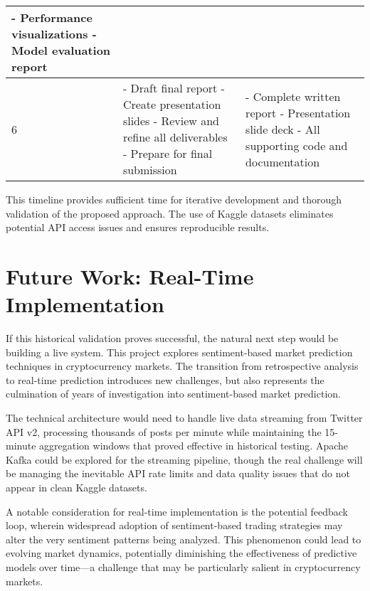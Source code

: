 \documentclass[11pt,twocolumn]{article}
\begin{document}
\begin{table}[h]
\begin{tabular}{|p{0.5cm}|p{3.5cm}|p{3.5cm}|}
- Performance visualizations\newline
- Model evaluation report \\
\hline
6 & - Draft final report\newline
- Create presentation slides\newline
- Review and refine all deliverables\newline
- Prepare for final submission & - Complete written report\newline
- Presentation slide deck\newline
- All supporting code and documentation \\
\hline
\end{tabular}
\end{table}

This timeline provides sufficient time for iterative development and thorough validation of the proposed approach. The use of Kaggle datasets eliminates potential API access issues and ensures reproducible results.

\section{Future Work: Real-Time Implementation}
If this historical validation proves successful, the natural next step would be building a live system. This project explores sentiment-based market prediction techniques in cryptocurrency markets. The transition from retrospective analysis to real-time prediction introduces new challenges, but also represents the culmination of years of investigation into sentiment-based market prediction.

The technical architecture would need to handle live data streaming from Twitter API v2, processing thousands of posts per minute while maintaining the 15-minute aggregation windows that proved effective in historical testing. Apache Kafka could be explored for the streaming pipeline, though the real challenge will be managing the inevitable API rate limits and data quality issues that do not appear in clean Kaggle datasets.

A notable consideration for real-time implementation is the potential feedback loop, wherein widespread adoption of sentiment-based trading strategies may alter the very sentiment patterns being analyzed. This phenomenon could lead to evolving market dynamics, potentially diminishing the effectiveness of predictive models over time—a challenge that may be particularly salient in cryptocurrency markets.
\end{document}
